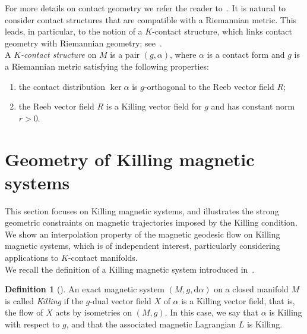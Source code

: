 \documentclass[11pt,reqno]{amsart}
\theoremstyle{plain}
\theoremstyle{definition}
\newtheorem{defn}[thm]{Definition}
\numberwithin{equation}{section}
\def\d{\delta}
\def\d{\delta}
\def\d{{\mathrm{d}}}
\begin{document}
For more details on contact geometry we refer the reader to~\cite{Gg08}. 
It is natural to consider contact structures that are compatible with a Riemannian metric. This leads, in particular, to the notion of a \(K\)-contact structure, which links contact geometry with Riemannian geometry; see~\cite{Blair}.\\

A \emph{\(K\)-contact structure} on \(M\) is a pair \((g,\alpha)\), where
\(\alpha\) is a contact form and \(g\) is a Riemannian metric satisfying the
following properties:
\begin{enumerate}[label=(K\arabic*),ref=K\arabic*]
    \item\label{it:1_K_contact}
    the contact distribution \(\ker\alpha\) is $g$-orthogonal to the Reeb vector
    field \(R\);
    \item\label{it:2_K_contact}
    the Reeb vector field \(R\) is a Killing vector field for \(g\) and has
    constant norm \(r>0\).
\end{enumerate}


\section{Geometry of Killing magnetic systems}
\label{section: Killing magnetic systems}
This section focuses on Killing magnetic systems, and illustrates the strong geometric constraints on magnetic trajectories imposed by the Killing condition. We show an interpolation property of the magnetic geodesic flow on Killing magnetic systems, which is of independent interest, particularly considering applications to $K$-contact manifolds.\\

We recall the definition of a Killing magnetic system introduced in~\cite{ABM}.

\begin{defn}[{\cite[Def. 2.1.]{ABM}}]
\label{defn: Killing}
An exact magnetic system $(M,g,\d\alpha)$ on a closed manifold $M$ is called \emph{Killing} if the $g$-dual vector field $X$ of $\alpha$ is a Killing vector field, that is, the flow of $X$ acts by isometries on $(M,g)$. 
In this case, we say that $\alpha$ is Killing with respect to $g$, and that the associated magnetic Lagrangian $L$ is Killing.
\end{defn}
\end{document}
